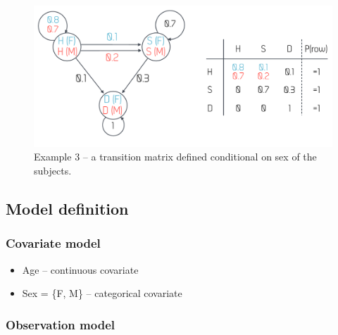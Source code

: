 \begin{figure}[ht!]
\centering
  \includegraphics[width=120mm]{pics/markovMatrixCond.pdf}
 \caption{Example 3 -- a transition matrix defined conditional on sex of the subjects.}
 \label{fig:markovMatrixCond}
\end{figure}

\subsection*{Model definition}

\subsubsection*{Covariate model}
\begin{itemize}
\item
Age -- continuous covariate
\item
Sex = \{F, M\} -- categorical covariate
\end{itemize}

\subsubsection*{Observation model}

